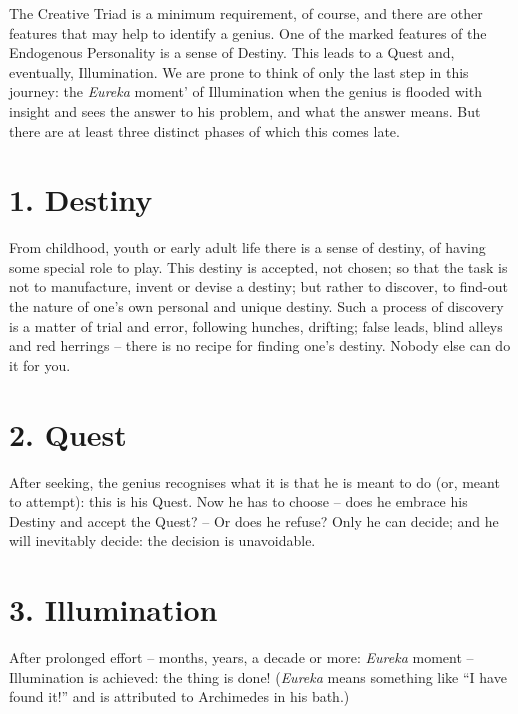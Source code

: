 \documentclass[
]{book}
\begin{document}
The Creative Triad is a minimum requirement, of course, and there are other features that may help to identify a genius. One of the marked features of the Endogenous Personality is a sense of Destiny. This leads to a Quest and, eventually, Illumination. We are prone to think of only the last step in this journey: the \emph{Eureka} moment' of Illumination when the genius is flooded with insight and sees the answer to his problem, and what the answer means. But there are at least three distinct phases of which this comes late.

\hypertarget{destiny}{%
\section*{1. Destiny}\label{destiny}}

From childhood, youth or early adult life there is a sense of destiny, of having some special role to play. This destiny is accepted, not chosen; so that the task is not to manufacture, invent or devise a destiny; but rather to discover, to find-out the nature of one's own personal and unique destiny. Such a process of discovery is a matter of trial and error, following hunches, drifting; false leads, blind alleys and red herrings -- there is no recipe for finding one's destiny. Nobody else can do it for you.

\hypertarget{quest}{%
\section*{2. Quest}\label{quest}}

After seeking, the genius recognises what it is that he is meant to do (or, meant to attempt): this is his Quest. Now he has to choose -- does he embrace his Destiny and accept the Quest? -- Or does he refuse? Only he can decide; and he will inevitably decide: the decision is unavoidable.

\hypertarget{illumination}{%
\section*{3. Illumination}\label{illumination}}

After prolonged effort -- months, years, a decade or more: \emph{Eureka} moment -- Illumination is achieved: the thing is done! (\emph{Eureka} means something like ``I have found it!'' and is attributed to Archimedes in his bath.)
\end{document}

